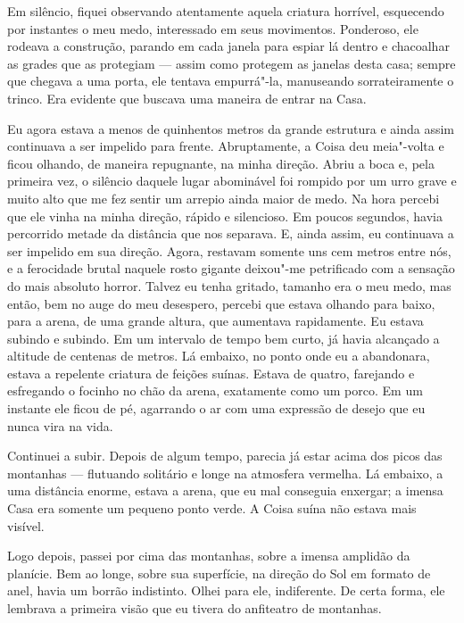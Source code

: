 Em silêncio, fiquei observando atentamente aquela criatura horrível, esquecendo por instantes o meu medo, interessado
em seus movimentos. Ponderoso, ele rodeava a construção, parando em cada janela para espiar lá dentro e
chacoalhar as grades que as protegiam --- assim como protegem as janelas desta casa; sempre que chegava a uma porta,
ele tentava empurrá"-la, manuseando sorrateiramente o trinco. Era evidente que buscava uma maneira de entrar na Casa.

Eu agora estava a menos de quinhentos metros da grande estrutura e ainda assim continuava a ser impelido para frente.
Abruptamente, a Coisa deu meia"-volta e ficou olhando, de maneira repugnante, na minha direção. Abriu a boca e, pela
primeira vez, o silêncio daquele lugar abominável foi rompido por um urro grave e muito alto que me fez sentir um
arrepio ainda maior de medo. Na hora percebi que ele vinha na minha direção, rápido e silencioso. Em
poucos segundos, havia percorrido metade da distância que nos separava. E, ainda assim, eu continuava a ser impelido
em sua direção. Agora, restavam somente uns cem metros entre nós, e a ferocidade brutal naquele rosto gigante deixou"-me
petrificado com a sensação do mais absoluto horror. Talvez eu tenha gritado, tamanho era o meu medo, mas então, bem no
auge do meu desespero, percebi que estava olhando para baixo, para a arena, de uma grande altura, que aumentava
rapidamente. Eu estava subindo e subindo. Em um intervalo de tempo bem curto, já havia alcançado a altitude
de centenas de metros. Lá embaixo, no ponto onde eu a abandonara, estava a repelente criatura de feições suínas. Estava de
quatro, farejando e esfregando o focinho no chão da arena, exatamente como um porco. Em um instante ele ficou de pé,
agarrando o ar com uma expressão de desejo que eu nunca vira na vida.

Continuei a subir. Depois de algum tempo, parecia já estar acima dos picos das montanhas --- flutuando solitário e longe na
atmosfera vermelha. Lá embaixo, a uma distância enorme, estava a arena, que eu mal conseguia enxergar; a
imensa Casa era somente um pequeno ponto verde. A Coisa suína não estava mais visível.

Logo depois, passei por cima das montanhas, sobre a imensa amplidão da planície. Bem ao longe, sobre sua superfície, na
direção do Sol em formato de anel, havia um borrão indistinto. Olhei para ele, indiferente. De certa forma, ele
lembrava a primeira visão que eu tivera do anfiteatro de montanhas.

